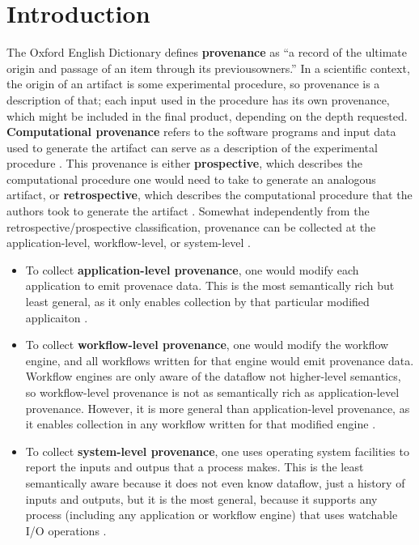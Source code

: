 \section{Introduction}

The Oxford English Dictionary defines \textbf{provenance} as ``a record of the ultimate origin and passage of an item through its previousowners.''
In a scientific context, the origin of an artifact is some experimental procedure, so provenance is a description of that;
each input used in the procedure has its own provenance, which might be included in the final product, depending on the depth requested.
\textbf{Computational provenance} refers to the software programs and input data used to generate the artifact can serve as a description of the experimental procedure \cite{freire_provenance_2008}.
This provenance is either \textbf{prospective}, which describes the computational procedure one would need to take to generate an analogous artifact, or \textbf{retrospective}, which describes the computational procedure that the authors took to generate the artifact \cite{zhao_applying_2006}.
Somewhat independently from the retrospective/prospective classification, provenance can be collected at the application-level, workflow-level, or system-level \cite{muniswamy-reddy_layering_2009,freire_provenance_2008}.

\begin{itemize}
\item
To collect \textbf{application-level provenance}, one would modify each application to emit provenace data.
This is the most semantically rich but least general, as it only enables collection by that particular modified applicaiton \cite{muniswamy-reddy_layering_2009}.

\item To collect \textbf{workflow-level provenance}, one would modify the workflow engine, and all workflows written for that engine would emit provenance data.
Workflow engines are only aware of the dataflow not higher-level semantics, so workflow-level provenance is not as semantically rich as application-level provenance.
However, it is more general than application-level provenance, as it enables collection in any workflow written for that modified engine \cite{freire_provenance_2008}.

\item
To collect \textbf{system-level provenance}, one uses operating system facilities to report the inputs and outpus that a process makes.
This is the least semantically aware because it does not even know dataflow, just a history of inputs and outputs, but it is the most general, because it supports any process (including any application or workflow engine) that uses watchable I/O operations \cite{freire_provenance_2008}.
\end{itemize}

